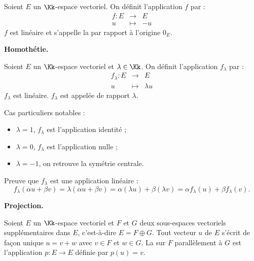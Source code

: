 \documentclass[class=report,crop=false]{standalone}
\begin{document}
Soient $E$ un $\Kk$-espace vectoriel.
On définit l'application
$f$ par :
$$\begin{array}{rcl}
f : E & \to & E \\
u & \mapsto & - u
  \end{array}$$
$f$ est linéaire et s'appelle la 
  par rapport à l'origine $0_E$.


\bigskip

\textbf{Homothétie.}

Soient $E$ un $\Kk$-espace vectoriel et $\lambda \in \Kk$.
On définit l'application
$f_{\lambda}$ par :
$$\begin{array}{rcl}
f_{\lambda} : E & \to & E \\
u & \mapsto & \lambda u
  \end{array}$$
$f_{\lambda}$ est linéaire.
$f_{\lambda}$ est appelée  de rapport $\lambda$.

Cas particuliers notables :
\begin{itemize}
  \item $\lambda = 1$, $f_{\lambda}$ est l'application identité ;
  \item $\lambda = 0$, $f_{\lambda}$ est l'application nulle ;
  \item $\lambda = -1$, on retrouve la symétrie centrale.
\end{itemize}

Preuve que $f_{\lambda}$ est une application linéaire :
$$
f_{\lambda}(\alpha u + \beta v)
= \lambda (\alpha u + \beta v)
= \alpha (\lambda u)+ \beta (\lambda v)
= \alpha f_{\lambda}(u) +\beta f_{\lambda}(v).
$$


\bigskip

\textbf{Projection.}

Soient $E$ un $\Kk$-espace vectoriel et $F$ et $G$ deux sous-espaces
vectoriels supplémentaires dans $E$, c'est-à-dire $E = F \oplus G$.
Tout vecteur $u$ de $E$ s'écrit de façon unique  $u=v+w$ avec $v \in F$ et $w \in G$.
La  sur $F$ parallèlement à $G$ est l'application $p : E \to E$
définie par $p(u)=v$.

\end{document}

